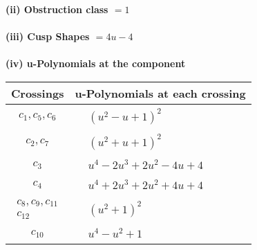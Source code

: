 \documentclass[1p]{elsarticle_modified}
\theoremstyle{definition}
\begin{document}
\flushleft \textbf{(ii) Obstruction class $= 1$}\\~\\
\flushleft \textbf{(iii) Cusp Shapes $= 4 u-4$}\\~\\
\newpage\renewcommand{\arraystretch}{1}
\flushleft \textbf{(iv) u-Polynomials at the component}\newline \\
\begin{tabular}{m{50pt}|m{274pt}}
Crossings & \hspace{64pt}u-Polynomials at each crossing \\
\hline $$\begin{aligned}c_{1},c_{5},c_{6}\end{aligned}$$&$\begin{aligned}
&(u^2- u+1)^2
\end{aligned}$\\
\hline $$\begin{aligned}c_{2},c_{7}\end{aligned}$$&$\begin{aligned}
&(u^2+u+1)^2
\end{aligned}$\\
\hline $$\begin{aligned}c_{3}\end{aligned}$$&$\begin{aligned}
&u^4-2 u^3+2 u^2-4 u+4
\end{aligned}$\\
\hline $$\begin{aligned}c_{4}\end{aligned}$$&$\begin{aligned}
&u^4+2 u^3+2 u^2+4 u+4
\end{aligned}$\\
\hline $$\begin{aligned}c_{8},c_{9},c_{11}\\c_{12}\end{aligned}$$&$\begin{aligned}
&(u^2+1)^2
\end{aligned}$\\
\hline $$\begin{aligned}c_{10}\end{aligned}$$&$\begin{aligned}
&u^4- u^2+1
\end{aligned}$\\
\hline
\end{tabular}\\~\\
\end{document}
